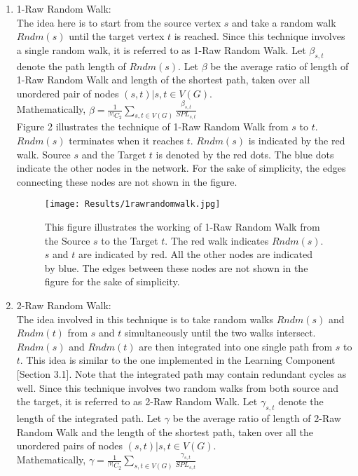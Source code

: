 \documentclass{article}
\begin{document}
\begin{enumerate}
\item 1-Raw Random Walk:\\
The idea here is to start from the source vertex $s$ and take a random walk $Rndm(s)$ until the target vertex $t$ is reached. Since this technique involves a single random walk, it is referred to as 1-Raw Random Walk. Let $\beta_{s,t}$ denote the path length of $Rndm(s)$. Let $\beta$ be the average ratio of length of 1-Raw Random Walk and length of the shortest path, taken over all unordered pair of nodes $(s,t) | s,t \in V(G)$.\\
Mathematically, $\beta = \frac{1}{^{|V|}C_2} \sum_{s,t \in V(G)} \frac{\beta_{s,t}}{SPL_{s,t}}$\\
Figure 2 illustrates the technique of 1-Raw Random Walk from $s$ to $t$. $Rndm(s)$ terminates when it reaches $t$. $Rndm(s)$ is indicated by the red walk. Source $s$ and the Target $t$ is denoted by the red dots. The blue dots indicate the other nodes in the network. For the sake of simplicity, the edges connecting these nodes are not shown in the figure.

\begin{figure}[htp]
\centering
\texttt{[image: Results/1rawrandomwalk.jpg]}
\caption{This figure illustrates the working of 1-Raw Random Walk from the Source $s$ to the Target $t$. The red walk indicates $Rndm(s)$. $s$ and $t$ are indicated by red. All the other nodes are indicated by blue. The edges between these nodes are not shown in the figure for the sake of simplicity.}
\label{}
\end{figure}

\item 2-Raw Random Walk:\\
The idea involved in this technique is to take random walks $Rndm(s)$ and $Rndm(t)$ from $s$ and $t$ simultaneously until the two walks intersect. $Rndm(s)$ and $Rndm(t)$ are then integrated into one single path from $s$ to $t$. This idea is similar to the one implemented in the Learning Component [Section 3.1]. Note that the integrated path may contain redundant cycles as well. Since this technique involves two random walks from both source and the target, it is referred to as 2-Raw Random Walk. Let $\gamma_{s,t}$ denote the length of the integrated path. Let $\gamma$ be the average ratio of length of 2-Raw Random Walk and the length of the shortest path, taken over all the unordered pairs of nodes $(s,t) | s,t \in V(G)$.\\
Mathematically, $\gamma = \frac{1}{^{|V|}C_2} \sum_{s,t \in V(G)} \frac{\gamma_{s,t}}{SPL_{s,t}}$


\end{enumerate}
\end{document}
